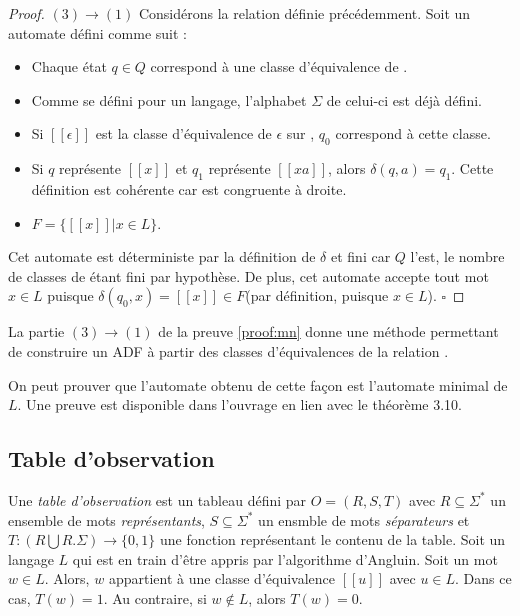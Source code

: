 \begin{proof}
		$(3)\rightarrow(1)$ Considérons la relation \rl définie précédemment. Soit un automate \automaton défini comme suit :
		\begin{itemize}
			\item Chaque état $q\in Q$ correspond à une classe d'équivalence de \rl.
			\item Comme \rl se défini pour un langage, l'alphabet $\Sigma$ de celui-ci est déjà défini.
			\item Si $[[\epsilon]]$ est la classe d'équivalence de $\epsilon$ sur \rl, $q_0$ correspond à cette classe.
			\item Si $q$ représente $[[x]]$ et $q_1$ représente $[[xa]]$, alors $\delta(q,a)=q_1$. Cette définition est cohérente car \rl est congruente à droite.
			\item $F = \{[[x]]|x \in L\}$.
		\end{itemize}
		Cet automate est déterministe par la définition de $\delta$ et fini car $Q$ l'est, le nombre de classes de \rl étant fini par hypothèse. De plus, cet automate accepte tout mot $x\in L$ puisque $\delta(q_0,x)=[[x]]\in F$(par définition, puisque $x\in L$).
		\hfill$\square$
	\end{proof}


	\begin{corollary}\label{col:constadf}
		La partie $(3)\rightarrow(1)$ de la preuve \ref{proof:mn} donne une méthode permettant de construire un ADF à partir des classes d'équivalences de la relation \rl.
	\end{corollary}

On peut prouver que l'automate obtenu de cette façon est l'automate minimal de $L$. Une preuve est disponible dans l'ouvrage \cite{Hopcroft79} en lien avec le théorème 3.10.


\subsection{Table d'observation}\label{angluin:to}


	Une \emph{table d'observation} est un tableau défini par $O=(R,S,T)$ avec $R\subseteq\Sigma^*$ un ensemble de mots \emph{représentants}, $S\subseteq\Sigma^*$ un ensmble de mots \emph{séparateurs} et $T:(R\bigcup R.\Sigma)\rightarrow\{0,1\}$ une fonction représentant le contenu de la table.\cite{Neider14}
	Soit un langage $L$ qui est en train d'être appris par l'algorithme d'Angluin. Soit un mot $w\in L$. Alors, $w$ appartient à une classe d'équivalence $[[u]]$ avec $u\in L$. Dans ce cas, $T(w)=1$. Au contraire, si $w\notin L$, alors $T(w)=0$.

